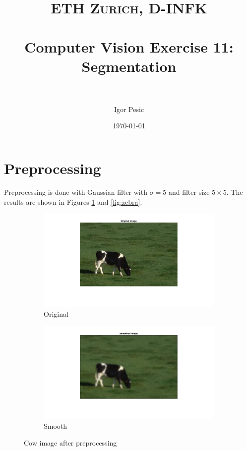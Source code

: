 \documentclass[paper=a4, fontsize=11pt]{scrartcl} %
\title{	
\normalfont \normalsize 
\textsc{ETH Zurich, D-INFK} \\ [25pt] %
\horrule{0.5pt} \\[0.4cm] %
\huge Computer Vision Exercise 11: Segmentation \\ %
\horrule{2pt} \\[0.5cm] %
}
\author{Igor Pesic} %
\date{\normalsize\today} %
\numberwithin{equation}{section} %
\numberwithin{figure}{section} %
\numberwithin{table}{section} %
\begin{document}
\maketitle %


\section{Preprocessing}
Preprocessing is done with Gaussian filter with $\sigma=5$ and filter size $5\times5$. The results are shown in Figures \ref{fig:cow} and \ref{fig:zebra}.

\begin{figure}
\centering
\begin{subfigure}{.5\textwidth}
  \centering
  \includegraphics[width=\linewidth]{cow/orig.jpg}
  \caption{Original}
\end{subfigure}%
\begin{subfigure}{.5\textwidth}
  \centering
  \includegraphics[width=\linewidth]{cow/smooth.jpg}
  \caption{Smooth}
\end{subfigure}
\caption{Cow image after preprocessing}
\label{fig:cow}
\end{figure}
\end{document}

